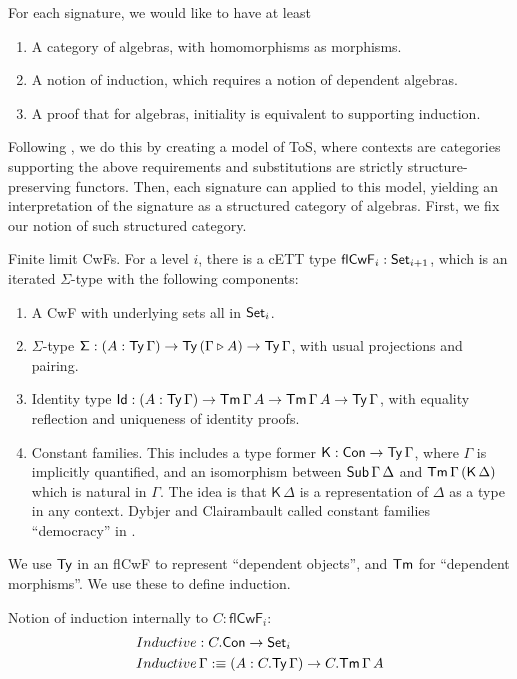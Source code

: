 \documentclass{llncs}
\newcommand{\ext}{\triangleright}
\newcommand{\Sg}{\mathsf{\Sigma}}
\newcommand{\flCwF}{\mathsf{flCwF}}
\newcommand{\Kfam}{\mathsf{K}}
\begin{document}
For each signature, we would like to have at least
\begin{enumerate}
  \item A category of algebras, with homomorphisms as morphisms.
  \item A notion of induction, which requires a notion of dependent algebras.
  \item A proof that for algebras, initiality is equivalent to supporting induction.
\end{enumerate}

Following \cite{TODO}, we do this by creating a model of ToS, where contexts are
categories supporting the above requirements and substitutions are strictly
structure-preserving functors. Then, each signature can applied to this model,
yielding an interpretation of the signature as a structured category of
algebras. First, we fix our notion of such structured category.

\begin{nidefinition}{Finite limit CwFs.}
For a level $i$, there is a cETT type $\flCwF_i : \Set_{i+1}$, which is an
iterated $\Sigma$-type with the following components:
\begin{enumerate}
  \item A CwF with underlying sets all in $\mathsf{Set}_i$.
  \item $\Sigma$-type $\Sg : (A : \Ty\,\Gamma)\ra \Ty\,(\Gamma \ext A)
    \ra \Ty\,\Gamma$, with usual projections and pairing.
  \item Identity type $\mathsf{Id} : (A : \mathsf{Ty}\,\Gamma)\rightarrow \mathsf{Tm}\,\Gamma\,A\rightarrow
    \mathsf{Tm}\,\Gamma\,A\rightarrow \mathsf{Ty}\,\Gamma$, with equality reflection and uniqueness
    of identity proofs.
  \item Constant families. This includes a type former $\Kfam : \Con \ra
    \Ty\,\Gamma$, where $\Gamma$ is implicitly quantified, and an isomorphism
    between $\mathsf{Sub}\,\Gamma\,\Delta$ and $\Tm\,\Gamma\,(\Kfam\,\Delta)$ which is
    natural in $\Gamma$. The idea is that $\Kfam\,\Delta$ is a representation
    of $\Delta$ as a type in any context. Dybjer and Clairambault called constant
    families ``democracy'' in \cite{TODO}.
\end{enumerate}
\end{nidefinition}

We use $\mathsf{Ty}$ in an flCwF to represent ``dependent objects'', and $\mathsf{Tm}$
for ``dependent morphisms''. We use these to define induction.

\begin{nidefinition} Notion of induction internally to $C : \flCwF_i$:
\begin{alignat*}{3}
  & Inductive : C.\mathsf{Con} \rightarrow \mathsf{Set}_i \\
  & Inductive\,\Gamma :\equiv (A : C.\mathsf{Ty}\,\Gamma)\rightarrow C.\mathsf{Tm}\,\Gamma\,A
\end{alignat*}
\end{nidefinition}
\end{document}
